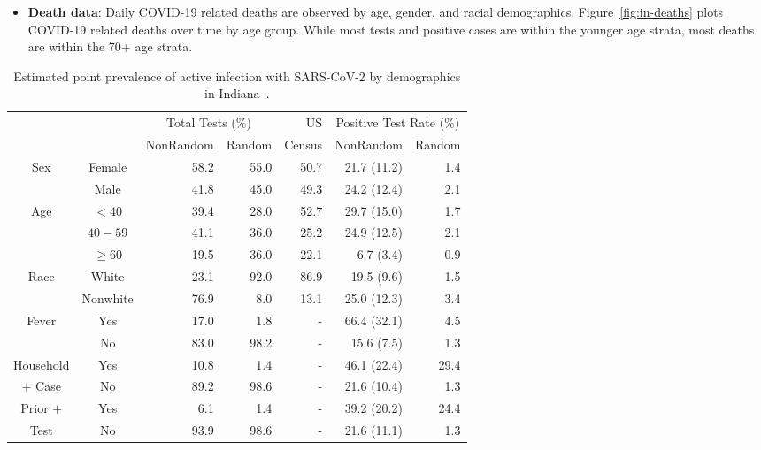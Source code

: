 \documentclass[11pt]{amsart}
\numberwithin{equation}{section}
\theoremstyle{plain}
\begin{document}
\begin{itemize}[leftmargin=*]
 \item {\bf Death data}: Daily COVID-19 related deaths are observed by age, gender, and racial demographics.  Figure~\ref{fig:in-deaths} plots COVID-19 related deaths over time by age group. While most tests and positive cases are within the younger age strata, most deaths are within the 70+ age strata.
 \end{itemize}


 \begin{table}[th]
 \begin{tabular}{c | c | r r | r | r r }
 & & \multicolumn{2}{c}{Total Tests (\%)} & US & \multicolumn{2}{c}{Positive Test Rate (\%)}\\
 \cline{3-4} \cline{6-7}
 & & NonRandom & Random & Census & NonRandom & Random \\ \hline
 \multirow{2}{*}{Sex} & Female & 58.2 & 55.0 & 50.7 & 21.7 (11.2) & 1.4 \\
 & Male & 41.8 & 45.0 & 49.3 & 24.2 (12.4) & 2.1 \\ \hline
 \multirow{3}{*}{Age} & $<40$ & 39.4 & 28.0 & 52.7 & 29.7 (15.0) & 1.7 \\
 & $40-59$ & 41.1 & 36.0 & 25.2 & 24.9 (12.5) & 2.1 \\
 & $\geq 60$ & 19.5 & 36.0 & 22.1 & 6.7 (3.4) & 0.9 \\ \hline
 \multirow{2}{*}{Race} & White & 23.1 & 92.0 & 86.9 & 19.5 (9.6) & 1.5 \\
 & Nonwhite & 76.9 & 8.0 & 13.1 & 25.0 (12.3) & 3.4 \\ \hline
 \multirow{2}{*}{Fever} & Yes & 17.0 & 1.8 & - & 66.4 (32.1) & 4.5 \\
 & No & 83.0 & 98.2 & - & 15.6 (7.5) & 1.3 \\ \hline
 Household & Yes & 10.8 & 1.4 & - & 46.1 (22.4) & 29.4 \\
 $+$ Case & No & 89.2 & 98.6 & - & 21.6 (10.4) & 1.3 \\ \hline
 Prior $+$ & Yes & 6.1 & 1.4 & - & 39.2 (20.2) & 24.4 \\
 Test & No & 93.9 & 98.6 & - & 21.6 (11.1) & 1.3 \\ \hline
 \end{tabular}
 \caption{Estimated point prevalence of active infection with SARS-CoV-2 by demographics in Indiana~\citep{Yiannoutsos2021}.}
 \label{tab:indiana}
 \end{table}
\end{document}
